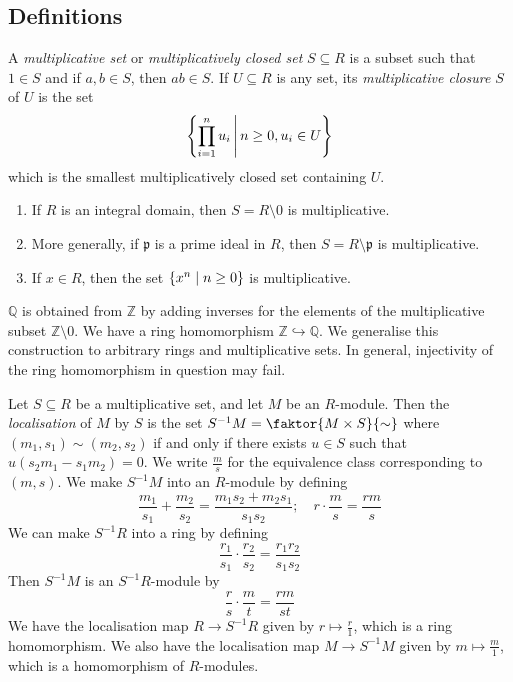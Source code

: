 \subsection{Definitions}
\begin{definition}
    A \emph{multiplicative set} or \emph{multiplicatively closed set} \( S \subseteq R \) is a subset such that \( 1 \in S \) and if \( a, b \in S \), then \( ab \in S \).
    If \( U \subseteq R \) is any set, its \emph{multiplicative closure} \( S \) of \( U \) is the set
    \[ \qty{\prod_{i = 1}^n u_i \,\middle|\,n \geq 0, u_i \in U} \]
    which is the smallest multiplicatively closed set containing \( U \).
\end{definition}
\begin{example}
    \begin{enumerate}
        \item If \( R \) is an integral domain, then \( S = R \setminus \qty{0} \) is multiplicative.
        \item More generally, if \( \mathfrak p \) is a prime ideal in \( R \), then \( S = R \setminus \mathfrak p \) is multiplicative.
        \item If \( x \in R \), then the set \( \qty{x^n \mid n \geq 0} \) is multiplicative.
    \end{enumerate}
\end{example}
\begin{remark}
    \( \mathbb Q \) is obtained from \( \mathbb Z \) by adding inverses for the elements of the multiplicative subset \( \mathbb Z \setminus \qty{0} \).
    We have a ring homomorphism \( \mathbb Z \hookrightarrow \mathbb Q \).
    We generalise this construction to arbitrary rings and multiplicative sets.
    In general, injectivity of the ring homomorphism in question may fail.
\end{remark}
\begin{definition}
    Let \( S \subseteq R \) be a multiplicative set, and let \( M \) be an \( R \)-module.
    Then the \emph{localisation} of \( M \) by \( S \) is the set \( S^{-1} M = \faktor{M \times S}{\sim} \) where \( (m_1, s_1) \sim (m_2, s_2) \) if and only if there exists \( u \in S \) such that \( u(s_2 m_1 - s_1 m_2) = 0 \).
    We write \( \frac{m}{s} \) for the equivalence class corresponding to \( (m, s) \).
    We make \( S^{-1} M \) into an \( R \)-module by defining
    \[ \frac{m_1}{s_1} + \frac{m_2}{s_2} = \frac{m_1 s_2 + m_2 s_1}{s_1 s_2};\quad r \cdot \frac{m}{s} = \frac{rm}{s} \]
    We can make \( S^{-1} R \) into a ring by defining
    \[ \frac{r_1}{s_1} \cdot \frac{r_2}{s_2} = \frac{r_1 r_2}{s_1 s_2} \]
    Then \( S^{-1}M \) is an \( S^{-1}R \)-module by
    \[ \frac{r}{s} \cdot \frac{m}{t} = \frac{r m}{s t} \]
    We have the localisation map \( R \to S^{-1}R \) given by \( r \mapsto \frac{r}{1} \), which is a ring homomorphism.
    We also have the localisation map \( M \to S^{-1}M \) given by \( m \mapsto \frac{m}{1} \), which is a homomorphism of \( R \)-modules.
\end{definition}
